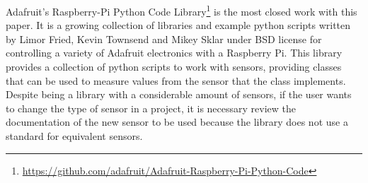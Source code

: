 \documentclass{acm_proc_article-sp}
\begin{document}
Adafruit's Raspberry-Pi Python Code Library\footnote{\url{https://github.com/adafruit/Adafruit-Raspberry-Pi-Python-Code}} is the most closed work with this paper. It is a growing collection of libraries and example python scripts written by Limor Fried, Kevin Townsend and Mikey Sklar under BSD license for controlling a variety of Adafruit electronics with a Raspberry Pi.
\newline
\newline
This library provides a collection of python scripts to work with sensors, providing classes that can be used to measure values from the sensor that the class implements. 
\newline
\newline
Despite being a library with a considerable amount of sensors, if the user wants to change the type of sensor in a project, it is necessary review the documentation of the new sensor to be used because the library does not use a standard for equivalent sensors.
\end{document}
